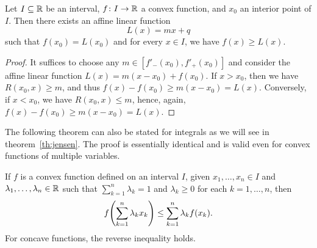  \begin{theorem}
    \label{th:supporto_convessa}%
    Let $I\subseteq {\mathbb R}$ be an interval, $f\colon I\to{\mathbb R}$ a convex function, 
        and $x_0$ an interior point of $I$. Then there exists an affine linear
    function
    \[
      L(x) = mx+q
    \]
    such that $f(x_0) = L(x_0)$ and for every $x\in I$, we have $f(x)\ge L(x)$.
  \end{theorem}
  \begin{proof}
        It suffices to choose any $m\in [f'_-(x_0),f'_+(x_0)]$ and consider the
    affine linear function $L(x) = m(x-x_0) + f(x_0)$. If $x>x_0$, then we have
    $R(x_0,x)\ge m$,
    and thus $f(x) - f(x_0) \ge m (x-x_0) = L(x)$. Conversely, if $x<x_0$, 
    we have $R(x_0,x)\le m$, hence, again, $f(x)-f(x_0) \ge m(x-x_0) = L(x)$.
  \end{proof}
  The following theorem can also be stated for integrals 
  as we will see in theorem~\ref{th:jensen}. 
  The proof is essentially identical and is valid even 
  for convex functions of multiple variables.
  \begin{theorem}
    \mymark{*}%
    \label{th:combinazioni_baricentriche}%
        If $f$ is a convex function defined on an interval $I$, given $x_1,
    \dots, x_n \in I$ and $\lambda_1, \dots, \lambda_n\in {\mathbb R}$ such that
    $\sum_{k=1}^n \lambda_k = 1$ and $\lambda_k \ge 0$ for each $k=1, \dots, n$,
    then
    \[
      f{\left( \sum_{k=1}^n \lambda_k x_k \right)}
      \le \sum_{k=1}^n \lambda_k f(x_k).
    \]
    For concave functions, the reverse inequality holds.
    \end{theorem}

